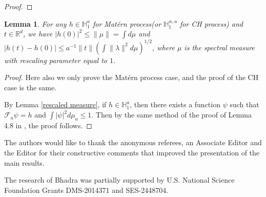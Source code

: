 \documentclass[ejs,noshowframe]{imsart}
\theoremstyle{plain}
\newtheorem{lemma}[theorem]{Lemma}
\theoremstyle{definition}
\theoremstyle{remark}
\begin{document}
\begin{appendix}
\begin{proof}

\end{proof}

\begin{lemma} \label{uniform distance within hilbert}
 For any $h \in \mathbb{H}_1^a$ for Mat\'ern process(or $\mathbb{H}_1^{\alpha,a}$ for CH process) and $t \in \mathbb{R}^d$, we have $|h(0)|^2 \leq \|\mu\|=\int d\mu$ and $|h(t)-h(0)| \leq a^{-1} \|t\| (\int \|\lambda\|^2 d \mu)^{1/2}$, where $\mu$ is the spectral measure with rescaling parameter equal to $1$.
\end{lemma}
\begin{proof}
Here also we only prove the Mat\'ern process case, and the proof of the CH case is the same.

By Lemma \ref{rescaled measure},  if $h \in \mathbb{H}_1^a$, then there exists a function $\psi$ such that $\mathcal{F}_a \psi=h$ and $\int |\psi|^2 d\mu_a \leq 1$. Then by the same method of the proof of Lemma 4.8 in \cite{van2009adaptive}, the proof follows.
\end{proof}

\end{appendix}

\begin{acks}[Acknowledgments]
The authors would like to thank the anonymous referees, an Associate
Editor and the Editor for their constructive comments that improved the presentation of the main results.
\end{acks}

\begin{funding}
The research of Bhadra was partially supported by U.S. National Science Foundation Grants DMS-2014371 and SES-2448704.
\end{funding}


    
\end{document}
